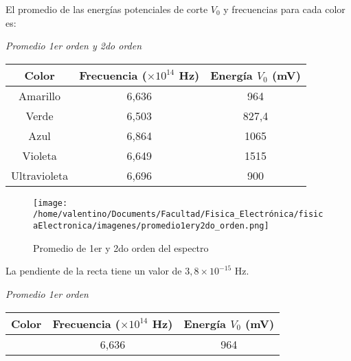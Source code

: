 \documentclass[a4paper]{article}
\begin{document}
      \indent El promedio de las energías potenciales de corte $V_{0}$ y frecuencias para cada color es:\\
      \begin{minipage}[c]{7.5cm}
        \vspace{5mm}
        \centering
        \textit{Promedio 1er orden y 2do orden}  
        \vspace{2mm}
      \end{minipage}

      \begin{tabular}{ c c c }
        \toprule
        Color & Frecuencia ($\times 10^{14}$ Hz) & Energía $V_{0}$ (mV) \\
          \midrule
          Amarillo      & 6,636 & 964   \\
          Verde         & 6,503 & 827,4 \\
          Azul          & 6,864 & 1065  \\
          Violeta       & 6,649 & 1515  \\
          Ultravioleta  & 6,696 & 900   \\
        \bottomrule
      \end{tabular}
      \vspace{5mm}

      \begin{figure}[h]
        \centering
        \texttt{[image: /home/valentino/Documents/Facultad/Fisica\_Electrónica/fisicaElectronica/imagenes/promedio1ery2do\_orden.png]}
        \caption{\small Promedio de 1er y 2do orden del espectro}
      \end{figure}
      \vspace{5mm}

      \indent La pendiente de la recta tiene un valor de $3,8 \times 10^{-15}$ Hz.
      \vspace{5mm}

      \begin{minipage}[c]{7.5cm}
        \vspace{5mm}
        \centering
        \textit{Promedio 1er orden} 
        \vspace{2mm}
      \end{minipage}

      \begin{tabular}{ c c c }
        \toprule
        Color & Frecuencia ($\times 10^{14}$ Hz) & Energía $V_{0}$ (mV) \\
          \midrule
          & 6,636 & 964 \\
        \bottomrule
      \end{tabular}
      
\end{document}
